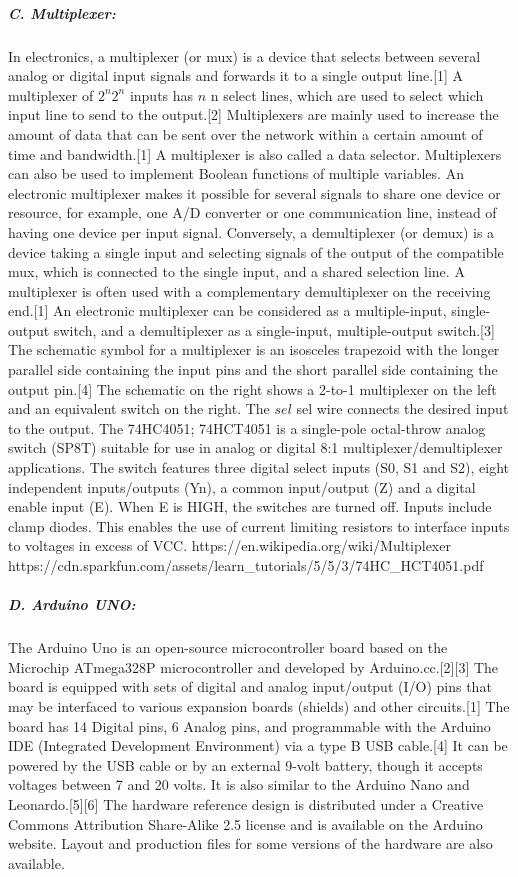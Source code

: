 \subparagraph{C. Multiplexer: }
In electronics, a multiplexer (or mux) is a device that selects between several analog 
or digital input signals and forwards it to a single output line.[1] A multiplexer of 
${\displaystyle 2^{n}} 2^{n}$ inputs has ${\displaystyle n}$ n select lines, which are 
used to select which input line to send to the output.[2] Multiplexers are mainly used 
to increase the amount of data that can be sent over the network within a certain amount 
of time and bandwidth.[1] A multiplexer is also called a data selector. Multiplexers can 
also be used to implement Boolean functions of multiple variables.
An electronic multiplexer makes it possible for several signals to share one device or 
resource, for example, one A/D converter or one communication line, instead of having one 
device per input signal.
Conversely, a demultiplexer (or demux) is a device taking a single input and selecting 
signals of the output of the compatible mux, which is connected to the single input, and 
a shared selection line. A multiplexer is often used with a complementary demultiplexer 
on the receiving end.[1]
An electronic multiplexer can be considered as a multiple-input, single-output switch, 
and a demultiplexer as a single-input, multiple-output switch.[3] The schematic symbol 
for a multiplexer is an isosceles trapezoid with the longer parallel side containing the 
input pins and the short parallel side containing the output pin.[4] The schematic on the 
right shows a 2-to-1 multiplexer on the left and an equivalent switch on the right. 
The ${\displaystyle sel}$ sel wire connects the desired input to the output.
The 74HC4051; 74HCT4051 is a single-pole octal-throw analog switch (SP8T) suitable for 
use in analog or digital 8:1 multiplexer/demultiplexer applications. The switch features 
three digital select inputs (S0, S1 and S2), eight independent inputs/outputs (Yn), a 
common input/output (Z) and a digital enable input (E). When E is HIGH, the switches are 
turned off. Inputs include clamp diodes. This enables the use of current limiting resistors 
to interface inputs to voltages in excess of VCC.
https://en.wikipedia.org/wiki/Multiplexer
https://cdn.sparkfun.com/assets/learn_tutorials/5/5/3/74HC_HCT4051.pdf\\


\subparagraph{D. Arduino UNO: }
The Arduino Uno is an open-source microcontroller board based on the Microchip ATmega328P 
microcontroller and developed by Arduino.cc.[2][3] The board is equipped with sets of digital 
and analog input/output (I/O) pins that may be interfaced to various expansion boards (shields) 
and other circuits.[1] The board has 14 Digital pins, 6 Analog pins, and programmable with 
the Arduino IDE (Integrated Development Environment) via a type B USB cable.[4] It can be 
powered by the USB cable or by an external 9-volt battery, though it accepts voltages between 
7 and 20 volts. It is also similar to the Arduino Nano and Leonardo.[5][6] The hardware 
reference design is distributed under a Creative Commons Attribution Share-Alike 2.5 license 
and is available on the Arduino website. Layout and production files for some versions of 
the hardware are also available.

